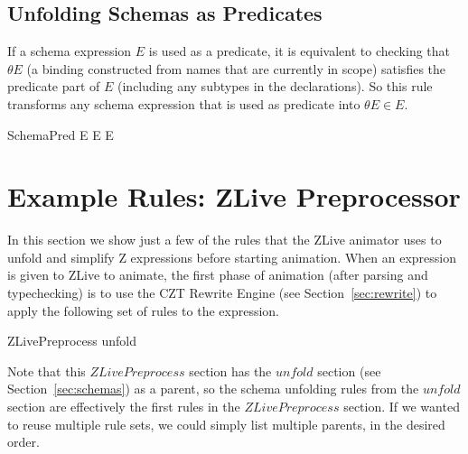 \documentclass{entcs}
\newcommand{\sexprUnfoldsTo}{\mathrel{=_{se}}}
\newcommand{\schemaEquals}{\mathrel{=_S}}
\begin{document}
%


\subsection{Unfolding Schemas as Predicates}

If a schema expression $E$ is used as a predicate, it is equivalent to
checking that $\theta E$ (a binding constructed from names that are
currently in scope) satisfies the predicate part of $E$ (including any
subtypes in the declarations).  So this rule transforms any schema
expression that is used as predicate into $\theta E \in E$.
\begin{zedrule}{SchemaPred}
  E \iff \theta E \in E
\end{zedrule}

\section{Example Rules: ZLive Preprocessor} \label{sec:zlive}

In this section we show just a few of the rules that the ZLive
animator uses to unfold and simplify Z expressions before starting
animation.  When an expression is given to ZLive to animate, the first
phase of animation (after parsing and typechecking) is to use the CZT
Rewrite Engine (see Section~\ref{sec:rewrite}) to apply the following
set of rules to the expression.

\begin{zsection}
  \SECTION ZLivePreprocess \parents unfold
\end{zsection}

Note that this $ZLivePreprocess$ section has the $unfold$ section (see
Section~\ref{sec:schemas}) as a parent, so the schema unfolding rules
from the $unfold$ section are effectively the first rules in the
$ZLivePreprocess$ section.  If we wanted to reuse multiple rule sets,
we could simply list multiple parents, in the desired order.
\end{document}
